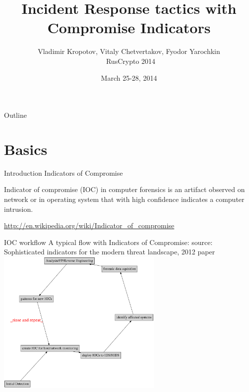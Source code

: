 \documentclass[presentation,smaller]{beamer}
\institute{Affilations:  Academia Sinica, o0o.nu, chroot.org}
\author{Vladimir Kropotov, Vitaly Chetvertakov, Fyodor Yarochkin\\\ RusCrypto 2014}
\date{March 25-28, 2014}
\title{Incident Response tactics with Compromise Indicators}
\begin{document}
\maketitle
\begin{frame}{Outline}
\tableofcontents
\end{frame}



\section{Basics}
\label{sec-1}
\begin{frame}[label=sec-1-1]{Introduction}
\alert{Indicators of Compromise}

Indicator of compromise (IOC) in computer forensics is an artifact
observed on network or in operating system that with high confidence
indicates a computer intrusion.

\url{http://en.wikipedia.org/wiki/Indicator_of_compromise}
\end{frame}


\begin{frame}[label=sec-1-2]{IOC workflow}
A typical flow with Indicators of Compromise:
\tiny
source: Sophisticated indicators for the modern threat landscape, 2012
paper
\normalsize
\includegraphics[width=8cm]{images/ioc.png}
\end{frame}
\end{document}
